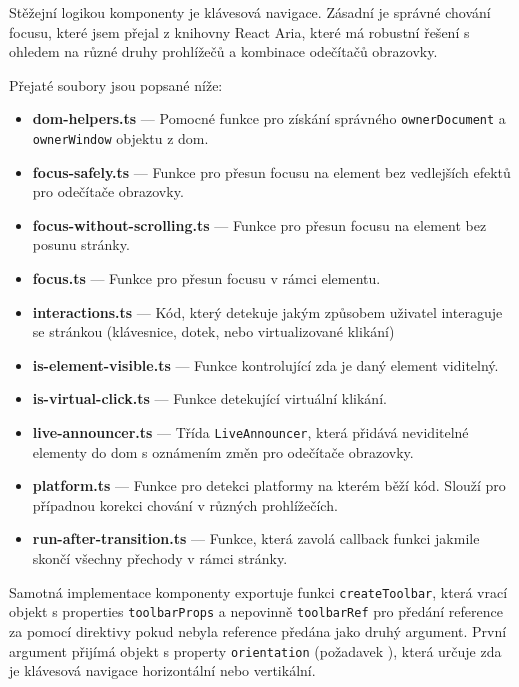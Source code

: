 Stěžejní logikou komponenty  je klávesová navigace.
Zásadní je správné chování focusu, které jsem přejal z knihovny React Aria, které má robustní řešení s ohledem na různé druhy prohlížečů a kombinace odečítačů obrazovky.

Přejaté soubory jsou popsané níže:

\begin{itemize}
    \item \textbf{dom-helpers.ts} --- Pomocné funkce pro získání správného \texttt{ownerDocument} a \texttt{ownerWindow} objektu z \gls{dom}.
    \item \textbf{focus-safely.ts} --- Funkce pro přesun focusu na element bez vedlejších efektů pro odečítače obrazovky.
    \item \textbf{focus-without-scrolling.ts} --- Funkce pro přesun focusu na element bez posunu stránky.
    \item \textbf{focus.ts} --- Funkce pro přesun focusu v rámci elementu.
    \item \textbf{interactions.ts} --- Kód, který detekuje jakým způsobem uživatel interaguje se stránkou (klávesnice, dotek, nebo virtualizované klikání)
    \item \textbf{is-element-visible.ts} --- Funkce kontrolující zda je daný element viditelný.
    \item \textbf{is-virtual-click.ts} --- Funkce detekující virtuální klikání.
    \item \textbf{live-announcer.ts} --- Třída \texttt{LiveAnnouncer}, která přidává neviditelné elementy do \gls{dom} s oznámením změn pro odečítače obrazovky.
    \item \textbf{platform.ts} --- Funkce pro detekci platformy na kterém běží kód. Slouží pro případnou korekci chování v různých prohlížečích.
    \item \textbf{run-after-transition.ts} --- Funkce, která zavolá callback funkci jakmile skončí všechny přechody v rámci stránky.
\end{itemize}

Samotná implementace komponenty exportuje funkci \texttt{createToolbar}, která vrací objekt s properties \texttt{toolbarProps} a nepovinně \texttt{toolbarRef} pro předání reference za pomocí direktivy pokud nebyla reference předána jako druhý argument.
První argument přijímá objekt s property \texttt{orientation} (požadavek \hyperref[tfr12]{}), která určuje zda je klávesová navigace horizontální nebo vertikální.

